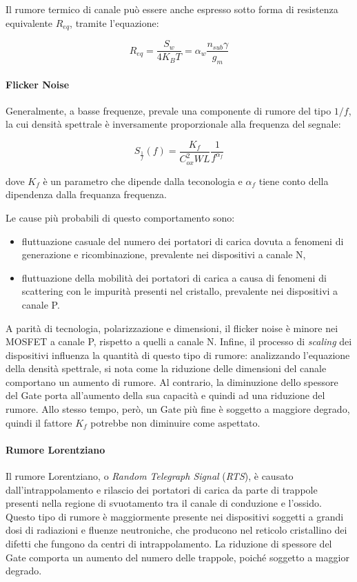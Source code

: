 Il rumore termico di canale può essere anche espresso sotto forma di resistenza equivalente $R_{eq}$, tramite l'equazione:

\begin{equation}
  R_{eq} = \frac{S_w}{4 K_B T} = \alpha_w \frac{n_{sub} \gamma}{g_m}
\end{equation}

\paragraph*{Flicker Noise}
Generalmente, a basse frequenze, prevale una componente di rumore del tipo $1/f$, la cui densità spettrale è inversamente proporzionale alla frequenza del segnale:

\begin{equation}
  S_{\frac{1}{f}} \left(f\right) = \frac{K_f}{C_{ox}^2 W L} \frac{1}{f^{\alpha_f}}
\end{equation}

dove $K_f$ è un parametro che dipende dalla teconologia e $\alpha_f$ tiene conto della dipendenza dalla frequanza frequenza.

Le cause più probabili di questo comportamento sono: 
\begin{itemize}
  \item fluttuazione casuale del numero dei portatori di carica dovuta a fenomeni di generazione e ricombinazione, prevalente nei dispositivi a canale N,
  \item fluttuazione della mobilità dei portatori di carica a causa di fenomeni di scattering con le impurità presenti nel cristallo, prevalente nei dispositivi a canale P.
\end{itemize}

A parità di tecnologia, polarizzazione e dimensioni, il flicker noise è minore nei MOSFET a canale P, rispetto a quelli a canale N. Infine, il processo di \emph{scaling} dei dispositivi influenza la quantità di questo tipo di rumore: analizzando l'equazione della densità spettrale, si nota come la riduzione delle dimensioni del canale comportano un aumento di rumore. Al contrario, la diminuzione dello spessore del Gate porta all'aumento della sua capacità e quindi ad una riduzione del rumore. Allo stesso tempo, però, un Gate più fine è soggetto a maggiore degrado, quindi il fattore $K_f$ potrebbe non diminuire come aspettato. 

\paragraph*{Rumore Lorentziano}
Il rumore Lorentziano, o \emph{Random Telegraph Signal} (\emph{RTS}), è causato dall'intrappolamento e rilascio dei portatori di carica da parte di trappole presenti nella regione di svuotamento tra il canale di conduzione e l'ossido. Questo tipo di rumore è maggiormente presente nei dispositivi soggetti a grandi dosi di radiazioni e fluenze neutroniche, che producono nel reticolo cristallino dei difetti che fungono da centri di intrappolamento. La riduzione di spessore del Gate comporta un aumento del numero delle trappole, poiché soggetto a maggior degrado.

